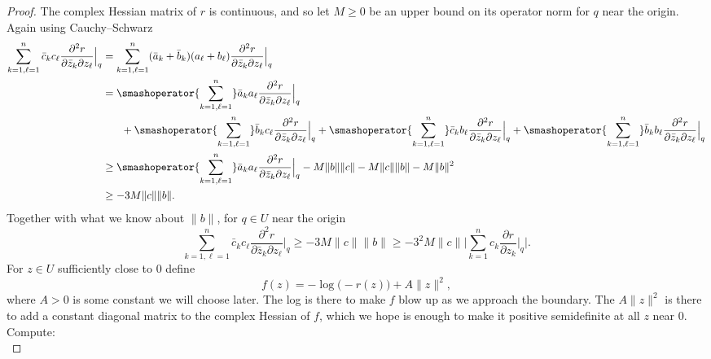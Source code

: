 \documentclass[12pt,openany]{book}
\newcommand{\snorm}[1]{\lVert {#1} \rVert}
\newcommand{\Babs}[1]{\Bigl\lvert {#1} \Bigr\rvert}
\newcommand{\BBabs}[1]{\Biggl\lvert {#1} \Biggr\rvert}
\theoremstyle{plain}
\theoremstyle{remark}
\theoremstyle{definition}
\theoremstyle{exercise}
\theoremstyle{example}
\begin{document}
\begin{proof}
\pagebreak[2]
The complex Hessian matrix of $r$ is continuous, and so let
$M \geq 0$ be an upper bound on its operator norm for $q$ near the origin.
Again using Cauchy--Schwarz
\begin{equation*}
\begin{split}
\sum_{k=1,\ell=1}^n
\bar{c}_k c_\ell \frac{\partial^2 r}{\partial \bar{z}_k \partial z_\ell} \Big|_q
& =
\sum_{k=1,\ell=1}^n
( \bar{a}_k + \bar{b}_k )  (a_\ell + b_\ell) \frac{\partial^2 r}{\partial \bar{z}_k \partial z_\ell} \Big|_q
\\
& =
\smashoperator{\sum_{k=1,\ell=1}^n}
\bar{a}_k a_\ell \frac{\partial^2 r}{\partial \bar{z}_k \partial z_\ell} \Big|_q
\\
& \phantom{=} \quad
+
\smashoperator{\sum_{k=1,\ell=1}^n}
\bar{b}_k c_\ell \frac{\partial^2 r}{\partial \bar{z}_k \partial z_\ell} \Big|_q
+
\smashoperator{\sum_{k=1,\ell=1}^n}
\bar{c}_k  b_\ell \frac{\partial^2 r}{\partial \bar{z}_k \partial z_\ell} \Big|_q
+
\smashoperator{\sum_{k=1,\ell=1}^n}
\bar{b}_k  b_\ell \frac{\partial^2 r}{\partial \bar{z}_k \partial z_\ell} \Big|_q
\\
& \geq
\smashoperator{\sum_{k=1,\ell=1}^n}
\bar{a}_k a_\ell \frac{\partial^2 r}{\partial \bar{z}_k \partial z_\ell} \Big|_q
-
M\snorm{b}\snorm{c}
-
M\snorm{c}\snorm{b}
-
M\snorm{b}^2
\\
& \geq
-
3 M\snorm{c}\snorm{b} .
\end{split}
\end{equation*}
Together with what we know about
$\snorm{b}$, for $q \in U$ near the origin
\begin{equation*}
\sum_{k=1,\ell=1}^n
\bar{c}_k c_\ell \frac{\partial^2 r}{\partial \bar{z}_k \partial z_\ell} \Big|_q
\geq -3M \snorm{c} \snorm{b} %
\geq
-3^2 M \snorm{c}\BBabs{\sum_{k=1}^n c_k \frac{\partial r}{\partial z_k}
\Big|_q} .
\end{equation*}
For $z \in U$ sufficiently close to $0$ define
\begin{equation*}
f(z) = -\log \bigl(-r(z)\bigr) + A \snorm{z}^2 ,
\end{equation*}
where $A > 0$ is some constant we will choose later.
The log is there to make $f$ blow up as we approach the boundary.
The $A \snorm{z}^2$ is there to add a constant diagonal matrix to the complex
Hessian of $f$, which we hope is enough to make it positive semidefinite at
all $z$ near $0$.
Compute:
\begin{equation*}

\end{equation*}
\end{proof}
\end{document}
